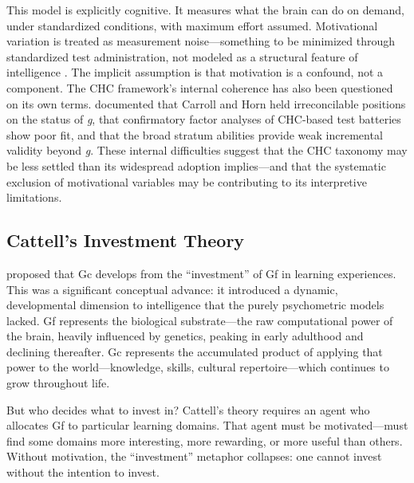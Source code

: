 \documentclass[12pt,a4paper]{article}
\begin{document}
This model is explicitly cognitive. It measures what the brain can do on demand, under standardized conditions, with maximum effort assumed. Motivational variation is treated as measurement noise---\hspace{0pt}something to be minimized through standardized test administration, not modeled as a structural feature of intelligence \citep{SchneiderMcGrew2018}. The implicit assumption is that motivation is a confound, not a component. The CHC framework's internal coherence has also been questioned on its own terms. \citet{CanivezYoungstrom2019} documented that Carroll and Horn held irreconcilable positions on the status of \emph{g}, that confirmatory factor analyses of CHC-based test batteries show poor fit, and that the broad stratum abilities provide weak incremental validity beyond \emph{g}. These internal difficulties suggest that the CHC taxonomy may be less settled than its widespread adoption implies---\hspace{0pt}and that the systematic exclusion of motivational variables may be contributing to its interpretive limitations.

\subsection{Cattell's Investment Theory}

\citet{Cattell1971} proposed that Gc develops from the ``investment'' of Gf in learning experiences. This was a significant conceptual advance: it introduced a dynamic, developmental dimension to intelligence that the purely psychometric models lacked. Gf represents the biological substrate---\hspace{0pt}the raw computational power of the brain, heavily influenced by genetics, peaking in early adulthood and declining thereafter. Gc represents the accumulated product of applying that power to the world---\hspace{0pt}knowledge, skills, cultural repertoire---\hspace{0pt}which continues to grow throughout life.

But who decides what to invest in? Cattell's theory requires an agent who allocates Gf to particular learning domains. That agent must be motivated---\hspace{0pt}must find some domains more interesting, more rewarding, or more useful than others. Without motivation, the ``investment'' metaphor collapses: one cannot invest without the intention to invest.
\end{document}
